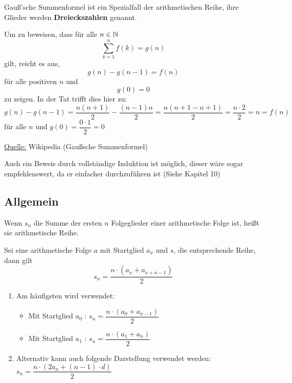 \documentclass[main.tex]{subfiles}
\begin{document}
\begin{Bemerkung}
	 Gauß'sche Summenformel ist ein Spezialfall der arithmetischen Reihe, ihre Glieder werden \textbf{Dreieckszahlen} genannt.
\end{Bemerkung}

\begin{Beweis}
	Um zu beweisen, dass für alle $n\in\mathbb{N}$
	$$\sum\limits_{k=1}^{n}f(k)=g(n)$$
	gilt, reicht es aus,
	$$g(n)-g(n-1)=f(n)$$
	für alle positiven $n$ und
	$$g(0)=0$$
	zu zeigen. In der Tat trifft dies hier zu:
	$$g(n)-g(n-1)=\dfrac{n(n+1)}{2}-\dfrac{(n-1)n}{2}=\dfrac{n(n+1-n+1)}{2}=\dfrac{n\cdot 2}{2}=n=f(n)$$
	für alle $n$ und $g(0)=\dfrac{0\cdot 1}{2}=0$

	\underline{Quelle:} Wikipedia (Gaußsche Summenformel)
\end{Beweis}

\begin{Bemerkung}
	Auch ein Beweis durch vollständige Induktion ist möglich, dieser wäre sogar empfehlenswert, da er einfacher durchzuführen ist (Siehe Kapitel 10)
\end{Bemerkung}


\subsection{Allgemein}

\begin{Definition}
	Wenn $s_{n}$ die Summe der ersten $n$ Folgeglieder einer arithmetische Folge ist, heißt sie arithmetische Reihe.

	Sei eine arithmetische Folge $a$ mit Startglied $a_{x}$ und $s$, die entsprechende Reihe, dann gilt
	$$s_{n}=\dfrac{n\cdot(a_{x}+a_{x+n-1})}{2}$$
\end{Definition}

\begin{Bemerkung}
	\begin{enumerate}
		\item Am häufigsten wird verwendet:
			\begin{itemize}
				\item Mit Startglied $a_{0}$ : $s_{n}=\dfrac{n\cdot(a_{0}+a_{n-1})}{2}$
				\item Mit Startglied $a_{1}$ : $s_{n}=\dfrac{n\cdot(a_{1}+a_{n})}{2}$
			\end{itemize}
		\item Alternativ kann auch folgende Darstellung verwendet werden:\\
		$s_{n}=\dfrac{n\cdot(2a_{x}+(n-1)\cdot d)}{2}$
	\end{enumerate}
\end{Bemerkung}
\end{document}
